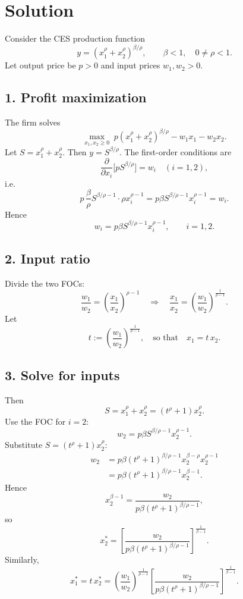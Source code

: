\section*{Solution}

Consider the CES production function
\[
y=\left(x_1^\rho+x_2^\rho\right)^{\beta/\rho},
\qquad \beta<1,\quad 0\ne \rho<1.
\]
Let output price be \(p>0\) and input prices \(w_1,w_2>0\).

\subsection*{1. Profit maximization}

The firm solves
\[
\max_{x_1,x_2\ge 0}\; p\left(x_1^\rho+x_2^\rho\right)^{\beta/\rho}-w_1x_1-w_2x_2.
\]
Let \(S=x_1^\rho+x_2^\rho\). Then \(y=S^{\beta/\rho}\).
The first-order conditions are
\[
\frac{\partial}{\partial x_i}\bigl[p S^{\beta/\rho}\bigr]=w_i
\quad (i=1,2),
\]
i.e.
\[
p\,\frac{\beta}{\rho}S^{\beta/\rho-1}\cdot \rho x_i^{\rho-1}
=
p\beta S^{\beta/\rho-1}x_i^{\rho-1}
=
w_i.
\]
Hence
\[
w_i=p\beta S^{\beta/\rho-1}x_i^{\rho-1},\qquad i=1,2.
\]

\subsection*{2. Input ratio}

Divide the two FOCs:
\[
\frac{w_1}{w_2}=\left(\frac{x_1}{x_2}\right)^{\rho-1}
\quad\Rightarrow\quad
\frac{x_1}{x_2}
=
\left(\frac{w_1}{w_2}\right)^{\frac{1}{\rho-1}}.
\]
Let
\[
t:=\left(\frac{w_1}{w_2}\right)^{\frac{1}{\rho-1}},
\quad\text{so that}\quad x_1=t\,x_2.
\]

\subsection*{3. Solve for inputs}

Then
\[
S=x_1^\rho+x_2^\rho=(t^\rho+1)x_2^\rho.
\]
Use the FOC for \(i=2\):
\[
w_2=p\beta S^{\beta/\rho-1}x_2^{\rho-1}.
\]
Substitute \(S=(t^\rho+1)x_2^\rho\):
\[
\begin{aligned}
w_2
&=p\beta (t^\rho+1)^{\beta/\rho-1}x_2^{\beta-\rho}x_2^{\rho-1}\\
&=
p\beta (t^\rho+1)^{\beta/\rho-1}x_2^{\beta-1}.
\end{aligned}
\]
Hence
\[
x_2^{\beta-1}
=
\frac{w_2}{p\beta (t^\rho+1)^{\beta/\rho-1}},
\]
so
\[
x_2^*
=
\left[
\frac{w_2}{p\beta (t^\rho+1)^{\beta/\rho-1}}
\right]^{\frac{1}{\beta-1}}.
\]
Similarly,
\[
x_1^*
=
t\,x_2^*
=
\left(\frac{w_1}{w_2}\right)^{\frac{1}{\rho-1}}
\left[
\frac{w_2}{p\beta (t^\rho+1)^{\beta/\rho-1}}
\right]^{\frac{1}{\beta-1}}.
\]


